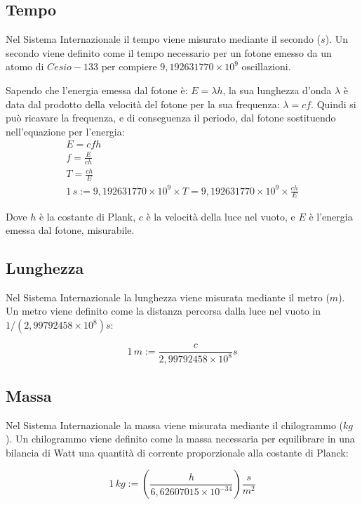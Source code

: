 \documentclass{article}
\numberwithin{equation}{subsection}
\begin{document}
\subsection{Tempo}

Nel Sistema Internazionale il tempo viene misurato mediante 
il secondo ($s$).
Un secondo viene definito come il tempo necessario per un 
fotone emesso da un atomo di $Cesio-133$ per compiere 
$9{,}192631770\times 10^9$ oscillazioni.



Sapendo che l'energia emessa dal fotone è: 
$E= \lambda h$, la sua lunghezza 
d'onda $\lambda$ è data dal prodotto della velocità del fotone 
per la sua frequenza: $\lambda  = cf$.
Quindi si può ricavare la frequenza, e di conseguenza il 
periodo, dal fotone sostituendo nell'equazione per l'energia: 
\begin{gather*}
    E = cfh\\
    f = \displaystyle\frac{E}{ch}\\
    T = \displaystyle\frac{ch}{E}\\
    1\,s := 9{,}192631770\times 10^9 \times T = 9{,}192631770\times 10^9 \times \displaystyle\frac{ch}{E}
\end{gather*}

Dove $h$ è la costante di Plank, $c$ è la velocità della luce nel vuoto, e $E$ è l'energia emessa dal fotone, misurabile.

\subsection{Lunghezza}
Nel Sistema Internazionale la lunghezza viene misurata 
mediante il metro ($m$). Un metro viene definito come la 
distanza percorsa dalla luce nel vuoto in 
$1/(2{,}99792458\times 10^8)s$:

\begin{equation*}
    1\,m := \displaystyle\frac{c}{2{,}99792458\times 10^8}s
\end{equation*}

\subsection{Massa}
Nel Sistema Internazionale la massa viene misurata mediante 
il chilogrammo ($kg$). Un chilogrammo viene definito come la 
massa necessaria per equilibrare in una bilancia di Watt una 
quantità di corrente proporzionale alla costante di Planck:

\begin{equation*}
    1\,kg := \left(\displaystyle\frac{ h}{ 6{,}62607015 \times 10^{-34}}\right)\frac{\displaystyle s}{\displaystyle m^{2}}
\end{equation*}
\end{document}
